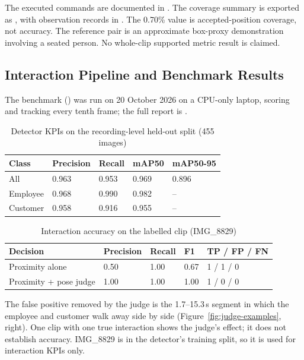 The executed commands are documented in . The coverage summary is exported as , with observation records in . The 0.70\% value is accepted-position coverage, not accuracy. The reference pair is an approximate box-proxy demonstration involving a seated person. No whole-clip supported metric result is claimed.

\subsection{Interaction Pipeline and Benchmark Results}
The benchmark () was run on 20 October 2026 on a CPU-only laptop, scoring and tracking every tenth frame; the full report is .

\begin{table}[H]
\centering
\caption{Detector KPIs on the recording-level held-out split (455 images)}\label{tab:detector-kpi}
\begin{tabular}{P{0.2\textwidth}P{0.14\textwidth}P{0.14\textwidth}P{0.14\textwidth}P{0.16\textwidth}}
\toprule
Class & Precision & Recall & mAP50 & mAP50-95\\
\midrule
All & 0.963 & 0.953 & 0.969 & 0.896\\
Employee & 0.968 & 0.990 & 0.982 & --\\
Customer & 0.958 & 0.916 & 0.955 & --\\
\bottomrule
\end{tabular}
\end{table}

\begin{table}[H]
\centering
\caption{Interaction accuracy on the labelled clip (IMG\_8829)}\label{tab:interaction-kpi}
\begin{tabular}{P{0.26\textwidth}P{0.13\textwidth}P{0.13\textwidth}P{0.1\textwidth}P{0.2\textwidth}}
\toprule
Decision & Precision & Recall & F1 & TP / FP / FN\\
\midrule
Proximity alone & 0.50 & 1.00 & 0.67 & 1 / 1 / 0\\
Proximity + pose judge & 1.00 & 1.00 & 1.00 & 1 / 0 / 0\\
\bottomrule
\end{tabular}
\end{table}
The false positive removed by the judge is the 1.7--15.3\,s segment in which the employee and customer walk away side by side (Figure~\ref{fig:judge-examples}, right). One clip with one true interaction shows the judge's effect; it does not establish accuracy. IMG\_8829 is in the detector's training split, so it is used for interaction KPIs only.

